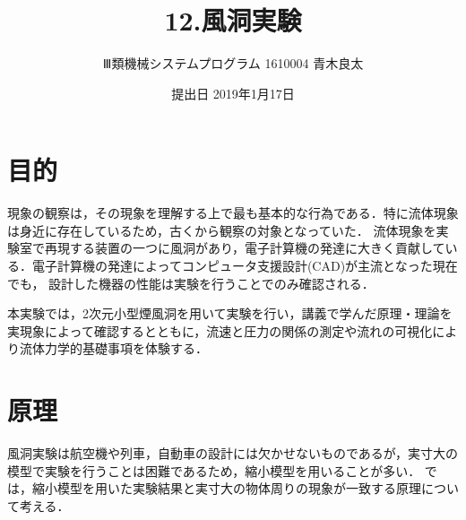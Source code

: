 \documentclass[a4paper,11pt,uplatex]{jsarticle}
\title{12.風洞実験}
\author{Ⅲ類機械システムプログラム 1610004 青木良太}
\date{提出日 2019年1月17日}
\begin{document}
\maketitle
\section{目的}
現象の観察は，その現象を理解する上で最も基本的な行為である．特に流体現象は身近に存在しているため，古くから観察の対象となっていた．
流体現象を実験室で再現する装置の一つに風洞があり，電子計算機の発達に大きく貢献している．電子計算機の発達によってコンピュータ支援設計(CAD)が主流となった現在でも，
設計した機器の性能は実験を行うことでのみ確認される．
\par
本実験では，2次元小型煙風洞を用いて実験を行い，講義で学んだ原理・理論を実現象によって確認するとともに，流速と圧力の関係の測定や流れの可視化により流体力学的基礎事項を体験する．
\section{原理}
風洞実験は航空機や列車，自動車の設計には欠かせないものであるが，実寸大の模型で実験を行うことは困難であるため，縮小模型を用いることが多い．
では，縮小模型を用いた実験結果と実寸大の物体周りの現象が一致する原理について考える．
\end{document}
